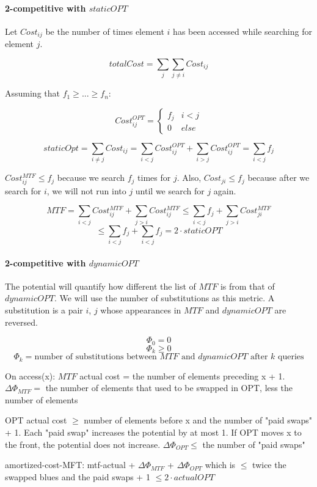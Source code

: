 \documentclass[a4paper]{article}
\begin{document}
\paragraph{2-competitive with $staticOPT$}
Let $Cost_{ij}$ be the number of times element $i$ has been accessed while searching for element $j$.

\[totalCost=\sum_{j}\sum_{j\ne i} Cost_{ij}\]

Assuming that $f_1\ge ... \ge f_n$:

\[Cost_{ij}^{OPT}=
\begin{cases}
  f_j & i < j \\
  0 & else
\end{cases}
\]

\[staticOpt=\sum_{i\ne j}Cost_{ij}=\sum_{i<j} Cost_{ij}^{OPT} + \sum_{i>j} Cost_{ij}^{OPT} = \sum_{i < j}f_j\]

$Cost_{ij}^{MTF}\le f_j$ because we search $f_j$ times for $j$. Also, $Cost_{ji}\le f_j$ because after we search for $i$, we will not run into $j$ until we search for $j$ again.

\[MTF=\sum_{i<j}Cost_{ij}^{MTF}+\sum_{j>i}Cost_{ij}^{MTF} \le \sum_{i<j}f_j+\sum_{j>i}Cost_{ji}^{MTF}\]
\[\le \sum_{i<j}f_j+\sum_{i<j}f_j=2\cdot staticOPT\]

\paragraph{2-competitive with $dynamicOPT$}
The potential will quantify how different the list of $MTF$ is from that of $dynamicOPT$. We will use the number of substitutions as this metric. A substitution is a pair $i$, $j$ whose appearances in $MTF$ and $dynamicOPT$ are reversed.

\[\Phi_0 = 0\]
\[\Phi_k \ge 0\]
\[\Phi_k=\text{number of substitutions between $MTF$ and $dynamicOPT$ after $k$ queries}\]

On access(x):
$MTF$ actual cost = the number of elements preceding x + 1.
$\Delta\Phi_{MTF}=$ the number of elements that used to be swapped in OPT, less the number of elements 

OPT actual cost $\ge$ number of elements before x and the number of "paid swaps" + 1.
Each "paid swap" increases the potential by at most 1. If OPT moves x to the front, the potential does not increase.
$\Delta\Phi_{OPT}\le$ the number of "paid swaps"

amortized-cost-MFT: mtf-actual + $\Delta\Phi_{MTF}$ + $\Delta\Phi_{OPT}$ which is $\le$ twice the swapped blues and the paid swaps + 1 $\le 2 \cdot actualOPT$
\end{document}
